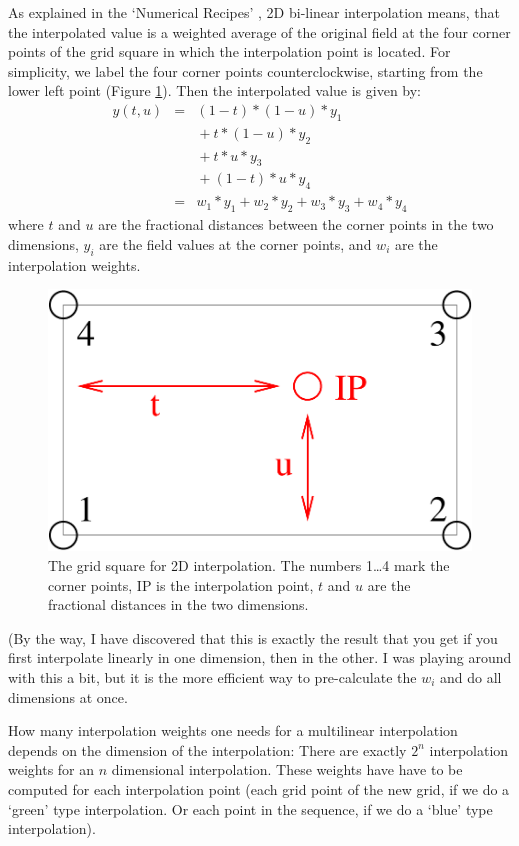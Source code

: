 As explained in the `Numerical Recipes'
\citep{numerical_recipes_C:97}, 2D bi-linear interpolation means, that
the interpolated value is a weighted average of the original field at
the four corner points of the grid square in which the interpolation
point is located. For simplicity, we label the four corner points
counterclockwise, starting from the lower left point (Figure
\ref{fig:interpolation:square}).  Then the interpolated value is given
by:
\begin{eqnarray}
  y(t,u)
  &=& (1-t)*(1-u)*y_1 \nonumber \\
  & & \mbox{} + t*(1-u)*y_2 \nonumber \\
  & & \mbox{} + t*u*y_3 \nonumber \\
  & & \mbox{} + (1-t)*u*y_4 \nonumber \\
  &=& w_1*y_1 + w_2*y_2 + w_3*y_3 + w_4*y_4
\label{eq:interpolation:weights}
\end{eqnarray}
where $t$ and $u$ are the fractional distances between the
corner points in the two dimensions, $y_i$ are the field values
at the corner points, and $w_i$ are the interpolation weights.

\begin{figure}
  \centering
  \includegraphics[width=.4\hsize]{interpolation_square}
  \caption{The grid square for 2D interpolation. The numbers 1\ldots 4
    mark the corner points, IP is the interpolation point, $t$ and $u$
    are the fractional distances in the two dimensions.}
  \label{fig:interpolation:square}
\end{figure}

(By the way, I have discovered that this is exactly the result that
you get if you first interpolate linearly in one dimension, then in
the other. I was playing around with this a bit, but it is the more
efficient way to pre-calculate the $w_i$ and do all dimensions at once.

How many interpolation weights one needs for a multilinear
interpolation depends on the dimension of the interpolation: There are
exactly $2^n$ interpolation weights for an $n$ dimensional
interpolation.  These weights have have to be computed for each
interpolation point (each grid point of the new grid, if we do a
`green' type interpolation. Or each point in the sequence, if we do a
`blue' type interpolation).

